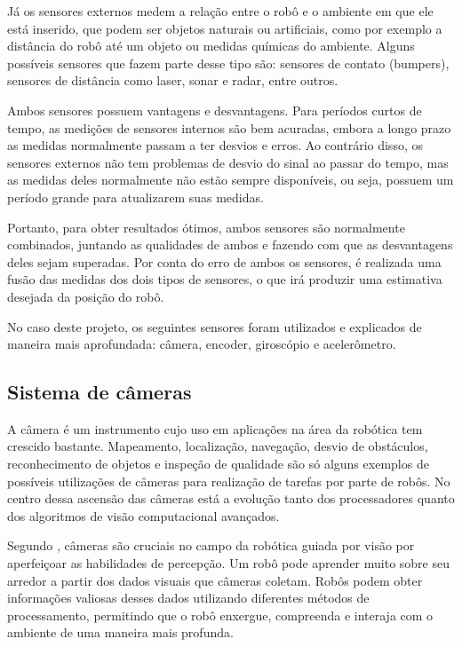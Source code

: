 \documentclass[acronym, symbols, table]{fei}
\begin{document}
			Já os sensores externos medem a relação entre o robô e o ambiente em que ele está inserido, que podem ser objetos naturais ou artificiais, como por exemplo a distância do robô até um objeto ou medidas químicas do ambiente. Alguns possíveis sensores que fazem parte desse tipo são: sensores de contato (bumpers), sensores de distância como laser, sonar e radar, entre outros.
			
			Ambos sensores possuem vantagens e desvantagens. Para períodos curtos de tempo, as medições de sensores internos são bem acuradas, embora a longo prazo as medidas normalmente passam a ter desvios e erros. Ao contrário disso, os sensores externos não tem problemas de desvio do sinal ao passar do tempo, mas as medidas deles normalmente não estão sempre disponíveis, ou seja, possuem um período grande para atualizarem suas medidas.
			
			Portanto, para obter resultados ótimos, ambos sensores são normalmente combinados, juntando as qualidades de ambos e fazendo com que as desvantagens deles sejam superadas. Por conta do erro de ambos os sensores, é realizada uma fusão das medidas dos dois tipos de sensores, o que irá produzir uma estimativa desejada da posição do robô.
			
			No caso deste projeto, os seguintes sensores foram utilizados e explicados de maneira mais aprofundada: câmera, encoder, giroscópio e acelerômetro.
			
			\subsection{Sistema de câmeras} \label{sec:sensores_cameras}
			
				A câmera é um instrumento cujo uso em aplicações na área da robótica tem crescido bastante. Mapeamento, localização, navegação, desvio de obstáculos, reconhecimento de objetos e inspeção de qualidade são só alguns exemplos de possíveis utilizações de câmeras para realização de tarefas por parte de robôs. No centro dessa ascensão das câmeras está a evolução tanto dos processadores quanto dos algoritmos de visão computacional avançados.
				
				Segundo \textcite{cameras_technexion}, câmeras são cruciais no campo da robótica guiada por visão por aperfeiçoar as habilidades de percepção. Um robô pode aprender muito sobre seu arredor a partir dos dados visuais que câmeras coletam. Robôs podem obter informações valiosas desses dados utilizando diferentes métodos de processamento, permitindo que o robô enxergue, compreenda e interaja com o ambiente de uma maneira mais profunda.
				
\end{document}
